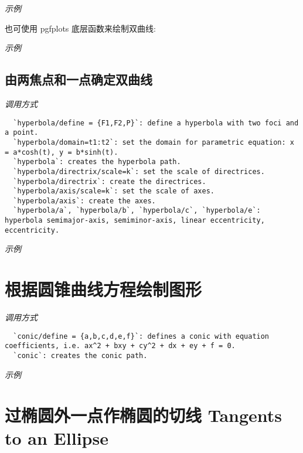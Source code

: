 \emph{示例}


也可使用 pgfplots 底层函数来绘制双曲线:

\emph{示例}


\subsection{由两焦点和一点确定双曲线}

\emph{调用方式}

\begin{verbatim}
  `hyperbola/define = {F1,F2,P}`: define a hyperbola with two foci and a point.
  `hyperbola/domain=t1:t2`: set the domain for parametric equation: x = a*cosh(t), y = b*sinh(t).
  `hyperbola`: creates the hyperbola path.
  `hyperbola/directrix/scale=k`: set the scale of directrices.
  `hyperbola/directrix`: create the directrices.
  `hyperbola/axis/scale=k`: set the scale of axes.
  `hyperbola/axis`: create the axes.
  `hyperbola/a`, `hyperbola/b`, `hyperbola/c`, `hyperbola/e`: hyperbola semimajor-axis, semiminor-axis, linear eccentricity, eccentricity.
\end{verbatim}

\emph{示例}


\section{根据圆锥曲线方程绘制图形}

\emph{调用方式}

\begin{verbatim}
  `conic/define = {a,b,c,d,e,f}`: defines a conic with equation coefficients, i.e. ax^2 + bxy + cy^2 + dx + ey + f = 0.
  `conic`: creates the conic path.
\end{verbatim}

\emph{示例}


\section{过椭圆外一点作椭圆的切线 Tangents to an Ellipse}


